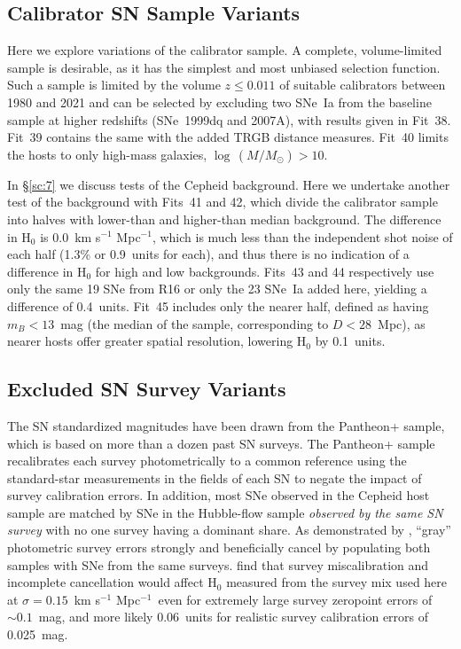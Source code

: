 \documentclass[12pt]{aastex631}
\newcommand{\kms}{km s$^{-1}$ Mpc$^{-1}$}
\begin{document}
\subsection{Calibrator SN Sample Variants\label{sc:6.9}}

Here we explore variations of the calibrator sample. A complete, volume-limited sample is desirable, as it has the simplest and most unbiased selection function. Such a sample is limited by the volume $z \leq 0.011$ of suitable calibrators between 1980 and 2021 and can be selected by excluding two SNe~Ia from the baseline sample at higher redshifts (SNe~1999dq and 2007A), with results given in Fit~38.  Fit~39 contains the same with the added TRGB distance measures.  Fit~40 limits the hosts to only high-mass galaxies, $\log\,(M/M_\odot) > 10$.  
  
In \S\ref{sc:7} we discuss tests of the Cepheid background.  Here we undertake another test of the background with Fits~41 and 42, which divide the calibrator sample into halves with lower-than and higher-than median background.  The difference in H$_0$ is 0.0~\kms, which is much less than the independent shot noise of each half (1.3\% or 0.9~units for each), and thus there is no indication of a difference in H$_0$ for high and low backgrounds.  Fits~43 and 44 respectively use only the same 19 SNe from R16 or only the 23 SNe~Ia added here, yielding a difference of 0.4~units. Fit~45 includes only the nearer half, defined as having $m_B < 13$~mag (the median of the sample, corresponding to $D < 28$~Mpc), as nearer hosts offer greater spatial resolution, lowering H$_0$ by 0.1~units.
   
\subsection{Excluded SN Survey Variants\label{sc:6.10}}
  
The SN standardized magnitudes have been drawn from the Pantheon+ sample, which is based on more than a dozen past SN surveys.  The Pantheon+ sample recalibrates each survey photometrically to a common reference using the standard-star measurements in the fields of each SN to negate the impact of survey calibration errors.  In addition, most SNe observed in the Cepheid host sample are matched by SNe in the Hubble-flow sample {\it observed by the same SN survey} with no one survey having a dominant share.  As demonstrated by \citet{Brownsberger:2021}, ``gray'' photometric survey errors strongly and beneficially cancel by populating both samples with SNe from the same surveys. \citet{Brownsberger:2021} find that survey miscalibration and incomplete cancellation would affect H$_0$ measured from the survey mix used here at $\sigma=0.15$~\kms\ even for extremely large survey zeropoint errors of $\sim 0.1$~mag, and more likely 0.06~units for realistic survey calibration errors of 0.025~mag.
  
\end{document}
